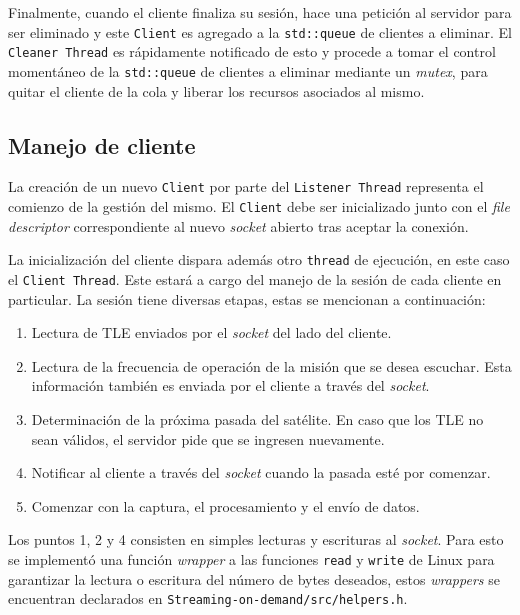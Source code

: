 \documentclass[../../main.tex]{subfiles}
\begin{document}
Finalmente, cuando el cliente finaliza su sesión, hace una petición al servidor para ser eliminado y este \texttt{Client} es agregado a la \texttt{std::queue} de clientes a eliminar. El \texttt{Cleaner Thread} es rápidamente notificado de esto y procede a tomar el control momentáneo de la \texttt{std::queue} de clientes a eliminar mediante un \textit{mutex}, para quitar el cliente de la cola y liberar los recursos asociados al mismo.



\subsection{Manejo de cliente}
La creación de un nuevo \texttt{Client} por parte del \texttt{Listener Thread} representa el comienzo de la gestión del mismo. El \texttt{Client} debe ser  inicializado junto con el \textit{file descriptor} correspondiente al nuevo \textit{socket} abierto tras aceptar la conexión. 

La inicialización del cliente dispara además otro \texttt{thread} de ejecución, en este caso el \texttt{Client Thread}. Este estará a cargo del manejo de la sesión de cada cliente en particular. La sesión tiene diversas etapas, estas se mencionan a continuación:
\begin{enumerate}
    \item Lectura de TLE enviados por el \textit{socket} del lado del cliente.
    \item Lectura de la frecuencia de operación de la misión que se desea escuchar. Esta información también es enviada por el cliente a través del \textit{socket}.
    \item Determinación de la próxima pasada del satélite. En caso que los TLE no sean válidos, el servidor pide que se ingresen nuevamente.
    \item Notificar al cliente a través del \textit{socket} cuando la pasada esté por comenzar.
    \item Comenzar con la captura, el procesamiento y el envío de datos.
\end{enumerate}

Los puntos 1, 2 y 4 consisten en simples lecturas y escrituras al \textit{socket}. Para esto se implementó una función \textit{wrapper} a las funciones \texttt{read} y \texttt{write} de Linux para garantizar la lectura o escritura del número de bytes deseados, estos \textit{wrappers} se encuentran declarados en \texttt{Streaming-on-demand/src/helpers.h}.
\end{document}
